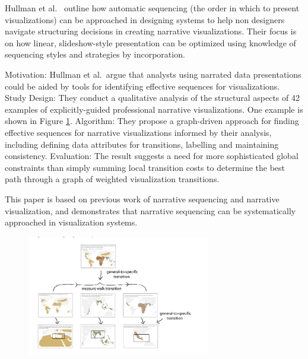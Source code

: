 \documentclass{egpubl}
\begin{document}
Hullman et al.\ \cite{hullman2013deeper} outline how automatic sequencing (the order in which to present visualizations) can be approached in designing systems to help non designers navigate structuring decisions in creating narrative visualizations. Their focus is on how linear, slideshow-style presentation can be optimized using knowledge of sequencing styles and strategies by incorporation.

Motivation: Hullman et al.\ argue that analysts using narrated data presentations could be aided by tools for identifying effective sequences for visualizations.
Study Design: They conduct a qualitative analysis of the structural aspects of 42 examples of explicitly-guided professional narrative visualizations. One example is shown in Figure \ref{fig:hullman2013deeper}.
Algorithm: They propose a graph-driven approach for finding effective sequences for narrative visualizations informed by their analysis, including defining data attributes for transitions, labelling and maintaining consistency.
Evaluation: The result suggests a need for more sophisticated global constraints than simply summing local transition costs to determine the best path through a graph of weighted visualization transitions.

This paper is based on previous work of narrative sequencing\cite{black1979} and narrative visualization\cite{hullman,segal}, and demonstrates that narrative sequencing can be systematically approached in visualization systems.
\begin{figure}
\begingroup
\centering
\includegraphics[width=8cm]{./images/hullman2013deeper}
\label{fig:hullman2013deeper}
\endgroup
\end{figure}
\end{document}
